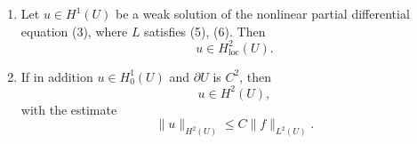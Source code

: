 \begin{theorem}
\label{thm:second-derivatives-minimizers}
\begin{enumerate}
\item[(i)] Let $u \in H^1(U)$ be a weak solution of the nonlinear partial differential equation (3), where $L$ satisfies (5), (6). Then
\[
u \in H^2_{\mathrm{loc}}(U).
\]
\item[(ii)] If in addition $u \in H_0^1(U)$ and $\partial U$ is $C^2$, then
\[
u \in H^2(U),
\]
with the estimate
\[
\|u\|_{H^2(U)} \le C\|f\|_{L^2(U)}.
\]
\end{enumerate}
\end{theorem}
